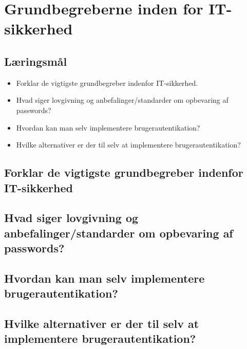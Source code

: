 \section{Grundbegreberne inden for IT-sikkerhed}

\subsection{Læringsmål}

\begin{itemize}
	\item Forklar de vigtigste grundbegreber indenfor IT-sikkerhed.
	\item Hvad siger lovgivning og anbefalinger/standarder om opbevaring af	passwords?
	\item Hvordan kan man selv implementere brugerautentikation?
	\item Hvilke alternativer er der til selv at implementere brugerautentikation?
\end{itemize}

\subsection{Forklar de vigtigste grundbegreber indenfor IT-sikkerhed}
\subsection{Hvad siger lovgivning og anbefalinger/standarder om opbevaring af passwords?}
\subsection{Hvordan kan man selv implementere brugerautentikation?}
\subsection{Hvilke alternativer er der til selv at implementere brugerautentikation?}
